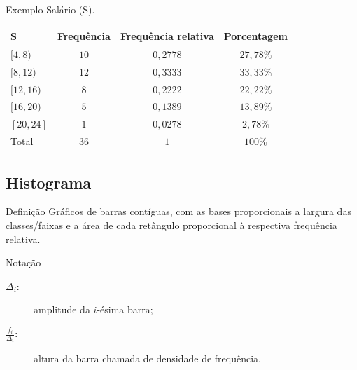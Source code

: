 \documentclass[9pt]{beamer}
\begin{document}
\begin{frame}{Exemplo}
	Salário (S).
	\begin{table}
		\centering
		\begin{tabular}{l|ccc}
			\toprule[0.05cm]
			S & Frequência & Frequência relativa & Porcentagem\\ \midrule[0.05cm]
			$[4,8)$ & $10$ & $0,2778$ & $27,78\%$\\
			$[8,12)$ & $12$ & $0,3333$ & $33,33\%$\\
			$[12,16)$ & $8$ & $0,2222$ & $22,22\%$\\
			$[16,20)$ & $5$ & $0,1389$ & $13,89\%$\\
			$[20,24]$ & $1$ & $0,0278$ & $2,78\%$\\
			\midrule[0.05cm]
			Total & $36$ & $1$ & $100\%$\\ \bottomrule[0.05cm]
		\end{tabular}
	\end{table}
\end{frame}

\subsection{Histograma}

\begin{frame}{}
 \begin{block}{Definição}
  Gráficos de barras contíguas, com as bases proporcionais a largura das classes/faixas e a área de cada retângulo proporcional à respectiva frequência relativa.
 \end{block}
 
 \begin{block}{Notação}
  \begin{description}
   \item[$\Delta_i:$] amplitude da $i$-ésima barra;
   \item[$\frac{f_i}{\Delta_i}:$] altura da barra chamada de densidade de frequência.
  \end{description}
 \end{block}
 
 \begin{figure}
  \centering
 \end{figure}

\end{frame}
\end{document}
